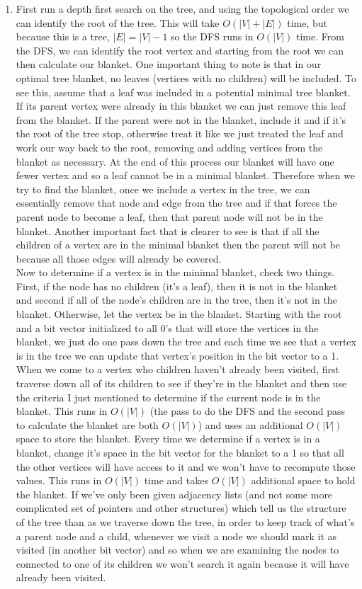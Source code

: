 \documentclass{article}
\begin{document}
\begin{enumerate}
	\item First run a depth first search on the tree, and using the topological order we can identify the root of the tree.  This will take $O(|V| + |E|)$ time, but because this is a tree, $|E| = |V| - 1$ so the DFS runs in $O(|V|)$ time.  From the DFS, we can identify the root vertex and starting from the root we can then calculate our blanket.  One important thing to note is that in our optimal tree blanket, no leaves (vertices with no children) will be included. To see this, assume that a leaf was included in a potential minimal tree blanket.  If its parent vertex were already in this blanket we can just remove this leaf from the blanket.  If the parent were not in the blanket, include it and if it's the root of the tree stop, otherwise treat it like we just treated the leaf and work our way back to the root, removing and adding vertices from the blanket as necessary.  At the end of this process our blanket will have one fewer vertex and so a leaf cannot be in a minimal blanket.  Therefore when we try to find the blanket, once we include a vertex in the tree, we can essentially remove that node and edge from the tree and if that forces the parent node to become a leaf, then that parent node will not be in the blanket.  Another important fact that is clearer to see is that if all the children of a vertex are in the minimal blanket then the parent will not be because all those edges will already be covered.  \\
	Now to determine if a vertex is in the minimal blanket, check two things.  First, if the node has no children (it's a leaf), then it is not in the blanket and second if all of the node's children are in the tree, then it's not in the blanket.  Otherwise, let the vertex be in the blanket.  Starting with the root and a bit vector initialized to all 0's that will store the vertices in the blanket, we just do one pass down the tree and each time we see that a vertex is in the tree we can update that vertex's position in the bit vector to a 1. When we come to a vertex who children haven't already been visited, first traverse down all of its children to see if they're in the blanket and then use the criteria I just mentioned to determine if the current node is in the blanket.  This runs in $O(|V|)$ (the pass to do the DFS and the second pass to calculate the blanket are both $O(|V|)$) and uses an additional $O(|V|)$ space to store the blanket.  Every time we determine if a vertex is in a blanket, change it's space in the bit vector for the blanket to a 1 so that all the other vertices will have access to it and we won't have to recompute those values. This runs in $O(|V|)$ time and takes $O(|V|)$ additional space to hold the blanket.  If we've only been given adjacency lists (and not some more complicated set of pointers and other structures) which tell us the structure of the tree than as we traverse down the tree, in order to keep track of what's a parent node and a child, whenever we visit a node we should mark it as visited (in another bit vector) and so when we are examining the nodes to connected to one of its children we won't search it again because it will have already been visited.  \\
 

\end{enumerate}
\end{document}
